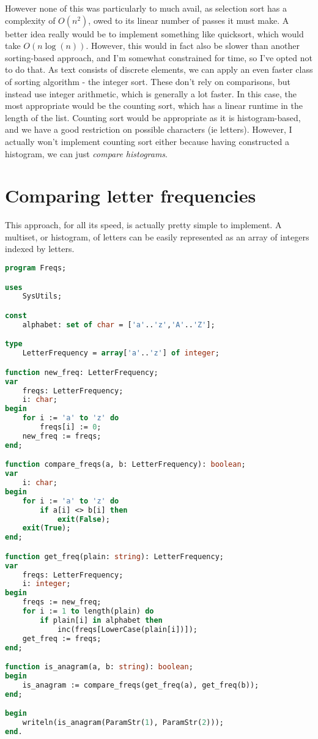 \documentclass{article}
\begin{document}
    However none of this was particularly to much avail, as selection sort has
    a complexity of $O(n^2)$, owed to its linear number of passes it must make.
    A better idea really would be to implement something like quicksort, which
    would take $O(n \log(n))$. However, this would in fact also be slower than
    another sorting-based approach, and I'm somewhat constrained for time, so
    I've opted not to do that. As text consists of discrete elements, we can
    apply an even faster class of sorting algorithm - the integer sort. These
    don't rely on comparisons, but instead use integer arithmetic, which is
    generally a lot faster. In this case, the most appropriate would be the
    counting sort, which has a linear runtime in the length of the list.
    Counting sort would be appropriate as it is histogram-based, and we have a
    good restriction on possible characters (ie letters). However, I actually
    won't implement counting sort either because having constructed a
    histogram, we can just \textit{compare histograms}.

    \section{Comparing letter frequencies}

    This approach, for all its speed, is actually pretty simple to implement. A
    multiset, or histogram, of letters can be easily represented as an array of
    integers indexed by letters.

\begin{lstlisting}[language=Pascal, caption=Basic letter frequencies in Pascal]
program Freqs;

uses
    SysUtils;

const
    alphabet: set of char = ['a'..'z','A'..'Z'];

type
    LetterFrequency = array['a'..'z'] of integer;

function new_freq: LetterFrequency;
var
    freqs: LetterFrequency;
    i: char;
begin
    for i := 'a' to 'z' do
        freqs[i] := 0;
    new_freq := freqs;
end;

function compare_freqs(a, b: LetterFrequency): boolean;
var
    i: char;
begin
    for i := 'a' to 'z' do
        if a[i] <> b[i] then
            exit(False);
    exit(True);
end;

function get_freq(plain: string): LetterFrequency;
var
    freqs: LetterFrequency;
    i: integer;
begin
    freqs := new_freq;
    for i := 1 to length(plain) do
        if plain[i] in alphabet then
            inc(freqs[LowerCase(plain[i])]);
    get_freq := freqs;
end;

function is_anagram(a, b: string): boolean;
begin
    is_anagram := compare_freqs(get_freq(a), get_freq(b));
end;

begin
    writeln(is_anagram(ParamStr(1), ParamStr(2)));
end.
\end{lstlisting}
\end{document}
